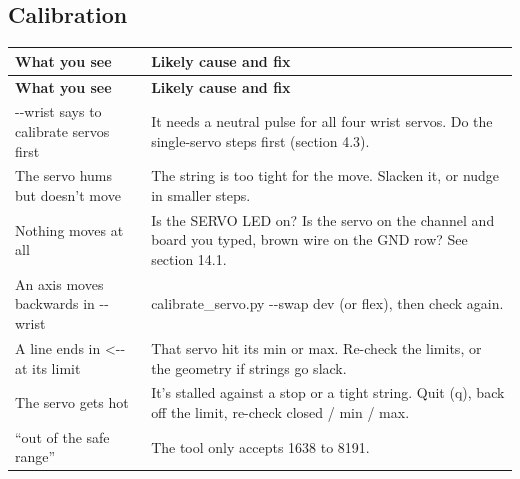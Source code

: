 \documentclass[11pt,letterpaper]{article}
\newcommand{\code}[1]{\textcolor{codeblue}{\ttfamily\smaller\relax #1}}
\begin{document}
\subsection{Calibration}
{\small
\begin{longtable}{|>{\raggedright\arraybackslash}p{}|>{\raggedright\arraybackslash}p{}|}
\hline
\rowcolor{tblhead}\textbf{What you see} & \textbf{Likely cause and fix} \\ \hline
\endfirsthead
\hline
\rowcolor{tblhead}\textbf{What you see} & \textbf{Likely cause and fix} \\ \hline
\endhead
\code{-{}-{}wrist} says to calibrate servos first & It needs a neutral pulse for all four wrist servos. Do the single-servo steps first (section 4.3). \\ \hline
The servo hums but doesn't move & The string is too tight for the move. Slacken it, or nudge in smaller steps. \\ \hline
Nothing moves at all & Is the SERVO LED on? Is the servo on the channel and board you typed, brown wire on the GND row? See section 14.1. \\ \hline
An axis moves backwards in \code{-{}-{}wrist} & \code{calibrate\_\allowbreak{}servo.py -{}-{}swap dev} (or \code{flex}), then check again. \\ \hline
A line ends in \code{<-{}-{} at its limit} & That servo hit its \code{min} or \code{max}. Re-check the limits, or the geometry if strings go slack. \\ \hline
The servo gets hot & It's stalled against a stop or a tight string. Quit (\code{q}), back off the limit, re-check \code{closed} / \code{min} / \code{max}. \\ \hline
``out of the safe range'' & The tool only accepts 1638 to 8191. \\ \hline
\end{longtable}}
\end{document}
